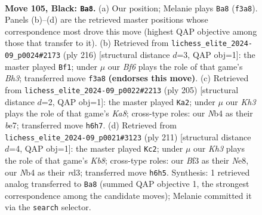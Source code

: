 \documentclass[11pt]{article}
\begin{document}
\clearpage

\begin{figure}[p]\centering
\begin{subfigure}{0.46\textwidth}\centering
\resizebox{\linewidth}{!}{%
\newchessgame
\chessboard[
  setfen={8/8/7k/8/1n6/5b1K/1B3P2/8 b - - 56 105},
  showmover=false,
  pgfstyle=straightmove, color=movearrow, markmove={f3-a8}
]}
\caption{}
\end{subfigure}\hfill
\begin{subfigure}{0.46\textwidth}\centering
\resizebox{\linewidth}{!}{%
\newchessgame
\chessboard[
  setfen={8/5p2/8/6k1/4K3/7B/8/b7 w - - 2 109},
  showmover=false,
  pgfstyle=straightmove, color=movearrow, markmove={h3-f1}
]}
\caption{}
\end{subfigure}
\\[4pt]
\begin{subfigure}{0.46\textwidth}\centering
\resizebox{\linewidth}{!}{%
\newchessgame
\chessboard[
  setfen={8/4B3/bP6/8/8/2K5/8/k7 b - - 34 103},
  showmover=false,
  pgfstyle=straightmove, color=movearrow, markmove={a1-a2}
]}
\caption{}
\end{subfigure}\hfill
\begin{subfigure}{0.46\textwidth}\centering
\resizebox{\linewidth}{!}{%
\newchessgame
\chessboard[
  setfen={4n3/8/4K1P1/8/1b6/3R4/8/1k6 b - - 12 106},
  showmover=false,
  pgfstyle=straightmove, color=movearrow, markmove={b1-c2}
]}
\caption{}
\end{subfigure}
\caption{\textbf{Move 105, Black: \texttt{Ba8}.} (a) Our position; Melanie plays \texttt{Ba8} (\texttt{f3a8}). Panels (b)--(d) are the retrieved master positions whose correspondence most drove this move (highest QAP objective among those that transfer to it). (b) Retrieved from \texttt{lichess\_elite\_2024-09\_p0024\#2173} (ply 216) [structural distance $d$=3, QAP obj=1]: the master played \texttt{Bf1}; under $\mu$ our \emph{Bf6} plays the role of that game's \emph{Bh3}; transferred move \texttt{f3a8} \textbf{(endorses this move)}. (c) Retrieved from \texttt{lichess\_elite\_2024-09\_p0022\#2213} (ply 205) [structural distance $d$=2, QAP obj=1]: the master played \texttt{Ka2}; under $\mu$ our \emph{Kh3} plays the role of that game's \emph{Ka8}; cross-type roles: our \emph{N}b4 as their \emph{b}e7; transferred move \texttt{h6h7}. (d) Retrieved from \texttt{lichess\_elite\_2024-09\_p0021\#3123} (ply 211) [structural distance $d$=4, QAP obj=1]: the master played \texttt{Kc2}; under $\mu$ our \emph{Kh3} plays the role of that game's \emph{Kb8}; cross-type roles: our \emph{B}f3 as their \emph{N}e8, our \emph{N}b4 as their \emph{r}d3; transferred move \texttt{h6h5}. Synthesis: 1 retrieved analog transferred to \texttt{Ba8} (summed QAP objective 1, the strongest correspondence among the candidate moves); Melanie committed it via the \texttt{search} selector.}
\label{fig:thought-m209}
\end{figure}
\end{document}
